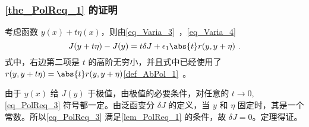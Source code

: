 \subsubsection{\autoref{the_PolReq_1} 的证明}
考虑函数 $y(x)+t\eta(x)$，则由\autoref{eq_Varia_3}~，\autoref{eq_Varia_4}~
\begin{equation}\label{eq_PolReq_3}
J(y+t\eta)-J(y)=t\delta J+\epsilon_1\abs{t}r(y,y+\eta)~.
\end{equation}
式中，右边第二项是 $t$ 的高阶无穷小，并且式中已经使用了 $r(y,y+t\eta)=\abs{t}r(y,y+\eta)$\autoref{def_AbPol_1}~。

由于 $y(x)$ 给 $J(y)$ 于极值，由极值的必要条件，对任意的 $t\rightarrow0$, \autoref{eq_PolReq_3} 符号都一定。由泛函变分 $\delta J$ 的定义，当 $y$ 和 $\eta$ 固定时，其是一个常数。所以\autoref{eq_PolReq_3} 满足\autoref{lem_PolReq_1} 的条件，故 $\delta J=0$。定理得证。
